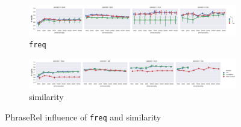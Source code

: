\begin{figure}[t]
  \centering

  \begin{subfigure}[t]{\textwidth}
    \includegraphics[width=1.1\textwidth]{supplement/figures/PhraseRel-interaction-freq}

  \caption{\texttt{freq}}
  \label{fig:phraserel-freq}
  \end{subfigure}

  \begin{subfigure}[t]{\textwidth}
    \includegraphics[width=1.1\textwidth]{supplement/figures/PhraseRel-interaction-similarity}

  \caption{similarity}
  \label{fig:phraserel-similarity}
  \end{subfigure}

  \caption{PhraseRel influence of \texttt{freq} and similarity}
\end{figure}
